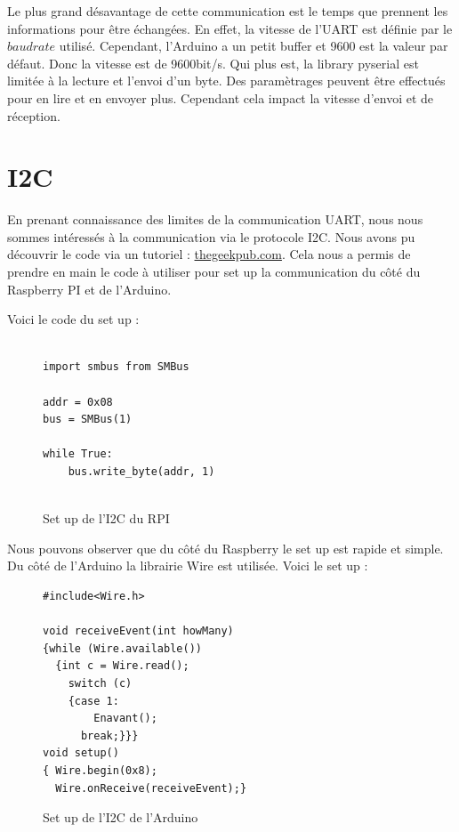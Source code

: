 \documentclass[
	a4paper,									%
	11pt,										%
	twoside,									%
	openright,									%
	notitlepage,									%
	parskip=half,								%
]{scrreprt}										%
\begin{document}
Le plus grand désavantage de cette communication est le temps que prennent les informations pour être échangées. 
En effet, la vitesse de l'UART est définie par le $baudrate$ utilisé. Cependant, l'Arduino a un petit buffer et 9600 est la valeur par défaut. 
Donc la vitesse est de 9600bit/s. 
Qui plus est, la library pyserial est limitée à la lecture et l'envoi d'un byte. Des paramètrages peuvent être effectués pour en lire et en envoyer plus. 
Cependant cela impact la vitesse d'envoi et de réception. \par


\section{I2C}

En prenant connaissance des limites de la communication UART, nous nous sommes intéressés à la communication 
via le protocole I2C. Nous avons pu découvrir le code via un tutoriel : \href{https://www.thegeekpub.com/18263/raspberry-pi-to-arduino-i2c-communication/}
{thegeekpub.com}. Cela nous a permis de prendre en main le code à utiliser pour set up la communication du côté 
du Raspberry PI et de l'Arduino. \par 

Voici le code du set up : 

\begin{figure}[!ht]
	
	\begin{verbatim}

import smbus from SMBus
	
addr = 0x08
bus = SMBus(1)

while True:
	bus.write_byte(addr, 1)


	\end{verbatim}
	\caption{Set up de l'I2C du RPI}
	\label{I2Ccomm}
	\end{figure}

Nous pouvons observer que du côté du Raspberry le set up est rapide et simple. Du côté de l'Arduino la librairie Wire
est utilisée. Voici le set up : 

\begin{figure}[!ht]
	
	\begin{verbatim}
#include<Wire.h>

void receiveEvent(int howMany)
{while (Wire.available())
  {int c = Wire.read();
	switch (c)
    {case 1:
        Enavant();
      break;}}}
void setup()
{ Wire.begin(0x8);
  Wire.onReceive(receiveEvent);}

	\end{verbatim}
	\caption{Set up de l'I2C de l'Arduino}
	\label{I2CcommArduino}
	\end{figure}
\end{document}
